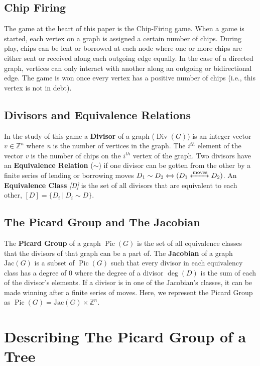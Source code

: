 \documentclass[11pt,reqno]{amsart}
\DeclareMathOperator{\Pic}{Pic}
\DeclareMathOperator{\Div}{Div}
\DeclareMathOperator{\Deg}{deg}
\newcommand{\Jac}{\textrm{Jac}}{}
\theoremstyle{definition}
\theoremstyle{plain}
\begin{document}
	\subsection{Chip Firing}
		The game at the heart of this paper is the Chip-Firing game. When a game is started, each vertex on
		a graph is assigned a certain number of chips.  During play, chips can be lent or borrowed at each
		node where one or more chips are either sent or received along each outgoing edge equally.  In the
		case of a directed graph, vertices can only interact with another along an outgoing or
		bidirectional edge.  The game is won once every vertex has a positive number of chips (i.e., this
		vertex is not in debt).

	\subsection{Divisors and Equivalence Relations}
		In the study of this game a \textbf{Divisor} of a graph ($\Div(G)$) is an integer vector $v\in\mathbb{Z}^n$
		where \textit{n} is the number of vertices in the graph.  The $i^{th}$ element of the vector \textit{v}
		is the number of chips on the $i^{th}$ vertex of the graph.  Two divisors have an \textbf{Equivalence Relation}
		($\sim$) if one divisor can be gotten from the other by a finite series of lending or borrowing moves
		$D_1 \sim D_2 \xleftrightarrow{} (D_1 \xleftrightarrow{\text{moves}} D_2)$.  An \textbf{Equivalence Class} \textit{[D]}
		is the set of all divisors that are equivalent to each other, $[D] = \{D_i~|~D_i \sim D\}$.

	\subsection{The Picard Group and The Jacobian}
		The \textbf{Picard Group} of a graph $\Pic(G)$ is the set of all equivalence classes that the
		divisors of that graph can be a  part of. The \textbf{Jacobian} of a graph  $\Jac(G)$ is a subset
		of $\Pic(G)$ such that every divisor in each equivalency class has a degree of $0$ where the
		degree of a divisor $\Deg(D)$ is the sum of each of the divisor's elements.
		If a divisor is in one of the Jacobian's classes, it can be made winning after a finite series of moves.
		Here, we represent the Picard Group as $\Pic(G)=\Jac(G)\times\mathbb{Z}^n$.


\section{Describing The Picard Group of a Tree}
\end{document}
